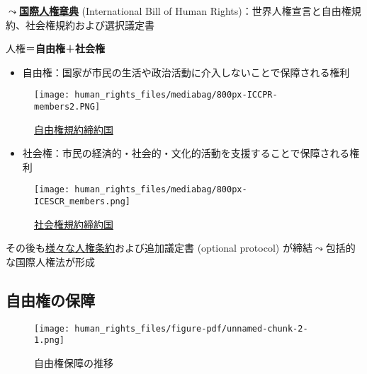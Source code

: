 \documentclass[
  xelatex,
  ja=standard]{bxjsarticle}
\providecommand{\tightlist}{%
  \setlength{\itemsep}{0pt}\setlength{\parskip}{0pt}}\usepackage{longtable,booktabs,array}
\begin{document}
\(\leadsto\)\href{https://www.unic.or.jp/activities/humanrights/document/bill_of_rights/}{\textbf{国際人権章典}}
(International Bill of Human
Rights)：世界人権宣言と自由権規約、社会権規約および選択議定書

人権＝\textbf{自由権}＋\textbf{社会権}

\begin{itemize}
\tightlist
\item
  自由権：国家が市民の生活や政治活動に介入しないことで保障される権利
\end{itemize}

\begin{figure}[htpb]

{\centering \texttt{[image: human\_rights\_files/mediabag/800px-ICCPR-members2.PNG]}

}

\caption{\href{https://commons.wikimedia.org/wiki/File:ICCPR-members2.PNG}{自由権規約締約国}}

\end{figure}

\begin{itemize}
\tightlist
\item
  社会権：市民の経済的・社会的・文化的活動を支援することで保障される権利
\end{itemize}

\begin{figure}[htpb]

{\centering \texttt{[image: human\_rights\_files/mediabag/800px-ICESCR\_members.png]}

}

\caption{\href{https://commons.wikimedia.org/wiki/File:ICESCR_members.svg}{社会権規約締約国}}

\end{figure}

その後も\href{https://www.ohchr.org/en/core-international-human-rights-instruments-and-their-monitoring-bodies}{様々な人権条約}および追加議定書
(optional protocol) が締結\(\leadsto\)包括的な国際人権法が形成

\hypertarget{ux81eaux7531ux6a29ux306eux4fddux969c}{%
\subsection{自由権の保障}\label{ux81eaux7531ux6a29ux306eux4fddux969c}}

\begin{figure}[htpb]

{\centering \texttt{[image: human\_rights\_files/figure-pdf/unnamed-chunk-2-1.png]}

}

\caption{自由権保障の推移}

\end{figure}
\end{document}
